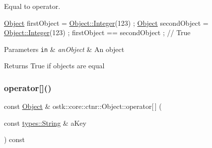 Equal to operator. 


\begin{DoxyCode}
\hyperlink{classostk_1_1core_1_1ctnr_1_1_object_a8e5ab6d15d9e28f3e2c65572f22aeb74}{Object} firstObject = \hyperlink{classostk_1_1core_1_1ctnr_1_1_object_af3bef3ae331e8e55662bf91a4cd5026f}{Object::Integer}(123) ;
\hyperlink{classostk_1_1core_1_1ctnr_1_1_object_a8e5ab6d15d9e28f3e2c65572f22aeb74}{Object} secondObject = \hyperlink{classostk_1_1core_1_1ctnr_1_1_object_af3bef3ae331e8e55662bf91a4cd5026f}{Object::Integer}(123) ;
firstObject == secondObject ; \textcolor{comment}{// True}
\end{DoxyCode}



\begin{DoxyParams}[1]{Parameters}
\mbox{\tt in}  & {\em an\+Object} & An object \\
\hline
\end{DoxyParams}
\begin{DoxyReturn}{Returns}
True if objects are equal 
\end{DoxyReturn}
\mbox{\label{classostk_1_1core_1_1ctnr_1_1_object_a8f790d53e0302068078e68bf6b5fb9cb}} 
\subsubsection{\texorpdfstring{operator[]()}{operator[]()}\hspace{0.1cm}{\footnotesize\ttfamily [1/4]}}
{\footnotesize\ttfamily const \hyperlink{classostk_1_1core_1_1ctnr_1_1_object}{Object} \& ostk\+::core\+::ctnr\+::\+Object\+::operator\mbox{[}$\,$\mbox{]} (\begin{DoxyParamCaption}\item[{const \hyperlink{classostk_1_1core_1_1types_1_1_string}{types\+::\+String} \&}]{a\+Key }\end{DoxyParamCaption}) const}

\mbox{\label{classostk_1_1core_1_1ctnr_1_1_object_a1e8fb86f3a900b44786fbf1f188a756e}} 
